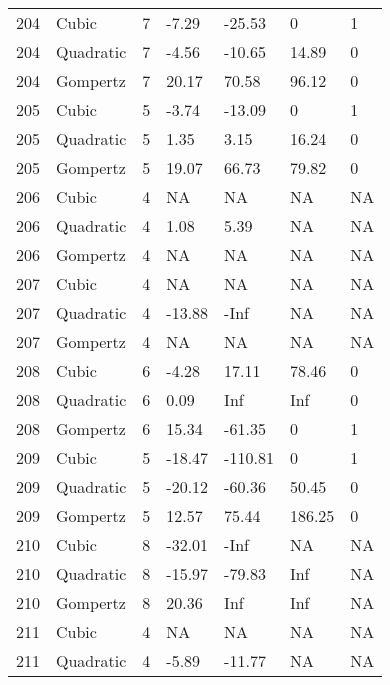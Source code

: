 \documentclass[11pt]{article}
\begin{document}
\begin{center}
\begin{longtable}{lllllll}
    204 & Cubic     & 7               & -7.29   & -25.53  & 0       & 1    \\
    204 & Quadratic & 7               & -4.56   & -10.65  & 14.89   & 0    \\
    204 & Gompertz  & 7               & 20.17   & 70.58   & 96.12   & 0    \\
    205 & Cubic     & 5               & -3.74   & -13.09  & 0       & 1    \\
    205 & Quadratic & 5               & 1.35    & 3.15    & 16.24   & 0    \\
    205 & Gompertz  & 5               & 19.07   & 66.73   & 79.82   & 0    \\
    206 & Cubic     & 4               & NA      & NA      & NA      & NA   \\
    206 & Quadratic & 4               & 1.08    & 5.39    & NA      & NA   \\
    206 & Gompertz  & 4               & NA      & NA      & NA      & NA   \\
    207 & Cubic     & 4               & NA      & NA      & NA      & NA   \\
    207 & Quadratic & 4               & -13.88  & -Inf    & NA      & NA   \\
    207 & Gompertz  & 4               & NA      & NA      & NA      & NA   \\
    208 & Cubic     & 6               & -4.28   & 17.11   & 78.46   & 0    \\
    208 & Quadratic & 6               & 0.09    & Inf     & Inf     & 0    \\
    208 & Gompertz  & 6               & 15.34   & -61.35  & 0       & 1    \\
    209 & Cubic     & 5               & -18.47  & -110.81 & 0       & 1    \\
    209 & Quadratic & 5               & -20.12  & -60.36  & 50.45   & 0    \\
    209 & Gompertz  & 5               & 12.57   & 75.44   & 186.25  & 0    \\
    210 & Cubic     & 8               & -32.01  & -Inf    & NA      & NA   \\
    210 & Quadratic & 8               & -15.97  & -79.83  & Inf     & NA   \\
    210 & Gompertz  & 8               & 20.36   & Inf     & Inf     & NA   \\
    211 & Cubic     & 4               & NA      & NA      & NA      & NA   \\
    211 & Quadratic & 4               & -5.89   & -11.77  & NA      & NA   \\

\end{longtable}
\end{center}
\end{document}
